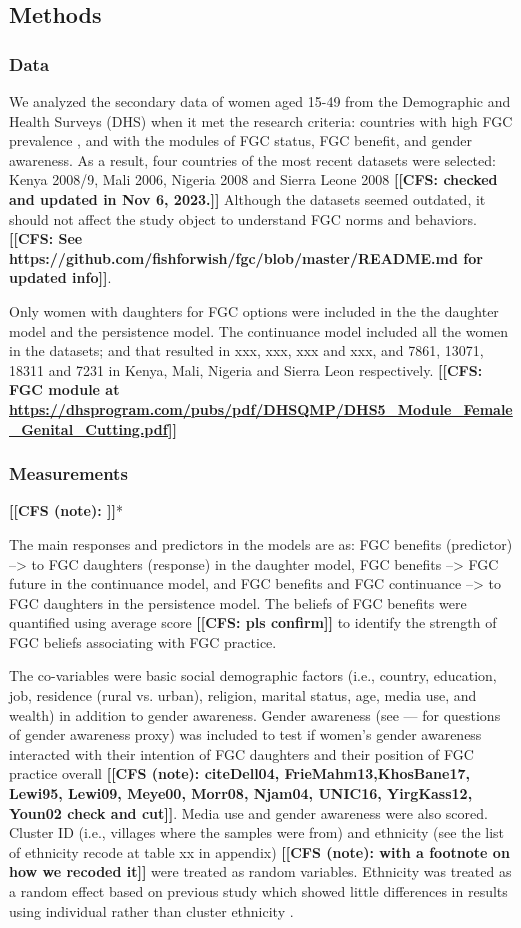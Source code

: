 \documentclass[12pt,]{article}
\newcommand{\comment}[1]{\textbf{[[#1]]}}
\newcommand{\cfcmt}[1]{\comment{CFS: #1}}
\newcommand{\cfonly}[1]{\comment{CFS (note): #1}}
\begin{document}
\subsection{Methods}\label{methods}

\subsubsection{Data}\label{data}

We analyzed the secondary data of women aged 15-49 from the Demographic and Health Surveys (DHS) when it met the research criteria:  countries with high FGC prevalence \cite{UNIC16}, and with the modules of FGC status, FGC benefit, and gender awareness. As a result, four countries of the most recent datasets were selected: Kenya 2008/9, Mali 2006, Nigeria 2008 and Sierra Leone 2008 \cfcmt{checked and updated in Nov 6, 2023.}   Although the datasets seemed outdated, it should not affect the study object to understand FGC norms and behaviors.  \cfcmt{See https://github.com/fishforwish/fgc/blob/master/README.md for updated info}.

Only women with daughters for FGC options were included in the the daughter model and the persistence model.   The continuance model included all the women in the datasets; and that resulted in xxx, xxx, xxx and xxx, and 7861, 13071, 18311 and 7231 in Kenya, Mali, Nigeria and Sierra Leon respectively.  \cfcmt{FGC module at \url{https://dhsprogram.com/pubs/pdf/DHSQMP/DHS5_Module_Female_Genital_Cutting.pdf}}

\subsubsection{Measurements}\label{measurements}

\cfonly{\cite{Rima08}}*

The main responses and predictors in the models are as: FGC benefits (predictor) -->  to FGC daughters (response) in the daughter model, FGC benefits --> FGC future in the continuance model, and FGC benefits and FGC continuance --> to FGC daughters in the persistence model.  The beliefs of FGC benefits were quantified using average score \cfcmt{pls confirm} to identify the strength of FGC beliefs associating with FGC practice.

The co-variables were basic social demographic factors (i.e., country, education, job, residence (rural vs. urban), religion, marital status, age, media use, and wealth) in addition to gender awareness.  Gender awareness (see — for questions of gender awareness proxy) was included to test if women’s gender awareness interacted with their intention of FGC daughters and their position of FGC practice overall \cfonly{cite{Dell04, FrieMahm13,KhosBane17, Lewi95, Lewi09, Meye00, Morr08, Njam04, UNIC16, YirgKass12, Youn02} check and cut}.  Media use and gender awareness were also scored.  Cluster ID (i.e., villages where the samples were from) and ethnicity (see the list of ethnicity recode at table xx in appendix) \cfonly{with a footnote on how we recoded it} were treated as random variables.  Ethnicity was treated as a random effect based on previous study which showed little differences in results using individual rather than cluster ethnicity \cite{Hayf05}.
\end{document}

